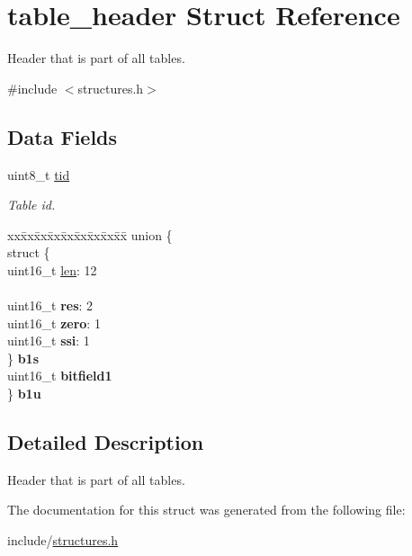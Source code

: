 \hypertarget{structtable__header}{}\section{table\+\_\+header Struct Reference}
\label{structtable__header}


Header that is part of all tables.  




{\ttfamily \#include $<$structures.\+h$>$}

\subsection*{Data Fields}
\begin{DoxyCompactItemize}
\item 
uint8\+\_\+t \hyperlink{structtable__header_a44f7dcd0d3d6a4f67c9cafac765274a9}{tid}\hypertarget{structtable__header_a44f7dcd0d3d6a4f67c9cafac765274a9}{}\label{structtable__header_a44f7dcd0d3d6a4f67c9cafac765274a9}

\begin{DoxyCompactList}\small\item\em Table id. \end{DoxyCompactList}\item 
\begin{tabbing}
xx\=xx\=xx\=xx\=xx\=xx\=xx\=xx\=xx\=\kill
union \{\\
\>struct \{\\
\>\>uint16\_t \hyperlink{structtable__header_a518aede5847a99d2a592f918f8011a47}{len}: 12\\
\>\>\\
\>\>uint16\_t {\bfseries res}: 2\\
\>\>uint16\_t {\bfseries zero}: 1\\
\>\>uint16\_t {\bfseries ssi}: 1\\
\>\} {\bfseries b1s}\\
\>uint16\_t {\bfseries bitfield1}\\
\} {\bfseries b1u}\hypertarget{structtable__header_adf4158f32bb426ab6831f3cc39bdd1cb}{}\label{structtable__header_adf4158f32bb426ab6831f3cc39bdd1cb}
\\

\end{tabbing}\end{DoxyCompactItemize}


\subsection{Detailed Description}
Header that is part of all tables. 

The documentation for this struct was generated from the following file\+:\begin{DoxyCompactItemize}
\item 
include/\hyperlink{structures_8h}{structures.\+h}\end{DoxyCompactItemize}
